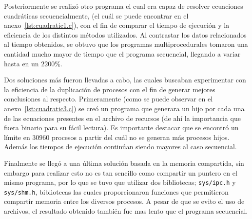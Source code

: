 Posteriormente se realizó otro programa el cual era capaz de resolver ecuaciones cuadráticas secuencialmente, (el cuál se puede encontrar en el anexo~\ref{lst:cuadratic1.c}), con el fin de comparar el tiempo de ejecución y la eficiencia de los distintos métodos utilizados. Al contrastar los datos relacionados al tiempo obtenidos, se obtuvo que los programas multiprocedurales tomaron una cantidad mucho mayor de tiempo que el programa secuencial, llegando a variar hasta en un $2200\%$.

Dos soluciones más fueron llevadas a cabo, las cuales buscaban experimentar con la eficiencia de la duplicación de procesos con el fin de generar mejores conclusiones al respecto. Primeramente (como se puede observar en el anexo~\ref{lst:cuadratic3.c}) se creó un programa que generara un hijo por cada una de las ecuaciones presentes en el archivo de recursos (de ahí la importancia que fuera binario para su fácil lectura). Es importante destacar que se encontró un límite en $30960$ procesos a partir del cuál no se generan más procesos hijos. Además los tiempos de ejecución continúan siendo mayores al caso secuencial.

Finalmente se llegó a una última solución basada en la memoria compartida, sin embargo para realizar esto no es tan sencillo como compartir un puntero en el mismo programa, por lo que se tuvo que utilizar dos bibliotecas; \verb|sys/ipc.h| y \verb|sys/shm.h|, bibliotecas las cuales proporcionaron funciones  que permitieron compartir memoria entre los diversos procesos. A pesar de que se evito el uso de archivos, el resultado obtenido también fue mas lento que el programa secuencial.